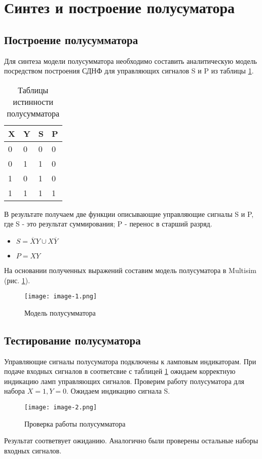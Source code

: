 \section*{Синтез и построение полусуматора}
\subsection*{Построение полусумматора}

Для синтеза модели полусумматора необходимо составить аналитическую модель 
посредством построения СДНФ для управляющих сигналов S и P из таблицы \ref{table:1}. \par

\begin{table}[h!]
    \begin{center}
        \begin{tabular}{ | m{1cm} | m{1cm} | m{1cm} | m{1cm} | }
            \hline
            X & Y & S & P \\ \hline
            0 & 0 & 0 & 0 \\ \hline 
            0 & 1 & 1 & 0 \\ \hline
            1 & 0 & 1 & 0 \\ \hline
            1 & 1 & 1 & 1 \\ \hline
        \end{tabular}
        \caption{Таблицы истинности полусумматора}
        \label{table:1}
    \end{center}    
\end{table}

В результате получаем две функции описывающие управляющие сигналы S и P, 
где S - это результат суммирования; P - перенос в старший разряд.
\begin{itemize}
    \item $S=\overline{X}Y \cup X\overline{Y}$
    \item $P=XY$
\end{itemize}

На основании полученных выражений составим модель полусуматора в Multisim 
(рис. \ref{image:1}).

\begin{figure}[h]
    \centering
    \texttt{[image: image-1.png]}
    \caption{Модель полусумматора}
    \label{image:1}
\end{figure}

\newpage
\subsection*{Тестирование полусуматора}
Управляющие сигналы полусуматора подключены к ламповым индикаторам. 
При подаче входных сигналов в соответсвие с таблицей \ref{table:1} ожидаем корректную индикацию 
ламп управляющих сигналов. Проверим работу полусуматора для набора $X=1,Y=0$. 
Ожидаем индикацию сигнала S. \par

\begin{figure}[h]
    \centering
    \texttt{[image: image-2.png]}
    \caption{Проверка работы полусумматора}
    \label{image:2}
\end{figure}

Результат соответвует ожиданию. Аналогично были проверены остальные наборы входных сигналов.